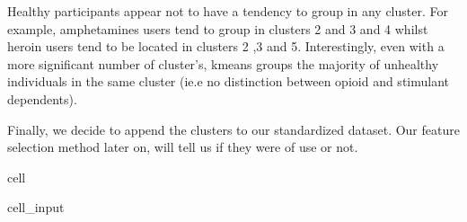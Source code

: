 \documentclass[letterpaper,10pt,english]{jupyterBook}
\begin{document}
\sphinxAtStartPar
Healthy participants appear not to have a tendency to group in any cluster. For example, amphetamines users tend to group in clusters 2 and 3 and 4 whilst heroin users tend to be located in clusters 2 ,3 and 5. Interestingly, even with a more significant number of cluster’s, k\sphinxhyphen{}means groups the majority of unhealthy individuals in the same cluster (ie.e no distinction between opioid and stimulant dependents).

\sphinxAtStartPar
Finally, we decide to append the clusters to our standardized dataset. Our feature selection method later on, will tell us if they were of use or not.

\begin{sphinxuseclass}{cell}\begin{sphinxVerbatimInput}

\begin{sphinxuseclass}{cell_input}
\begin{sphinxVerbatim}[commandchars=\\\{\}]
  
\PYG{p}{[}\PYG{p}{]}  \PYG{p}{[}\PYG{p}{]}\PYG{p}{[}\PYG{p}{]}\PYG{p}{[}\PYG{p}{]}
\PYG{p}{[}\PYG{p}{]} 
\end{sphinxVerbatim}

\end{sphinxuseclass}\end{sphinxVerbatimInput}
\begin{sphinxVerbatimOutput}


\end{sphinxVerbatimOutput}
\end{sphinxuseclass}
\end{document}
